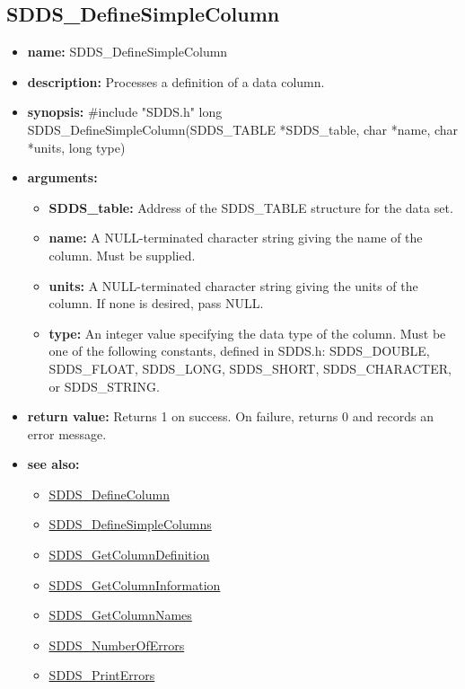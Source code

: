 \documentclass[11pt]{article}
\newcommand{\progref}[1]{\hyperref{SDDS_#1}{{\tt SDDS\_#1} (}{)}{SDDS_#1}}
\begin{document}
\subsection{SDDS\_DefineSimpleColumn}
\label{SDDS_DefineSimpleColumn}

\begin{itemize}
\item {\bf name:}\newline
SDDS\_DefineSimpleColumn
\item {\bf description:}\newline
Processes a definition of a data column.
\item {\bf synopsis:} \#include "SDDS.h"\newline
long SDDS\_DefineSimpleColumn(SDDS\_TABLE *SDDS\_table, char *name, char *units, long type)
\item {\bf arguments:}
\begin{itemize}
\item {\bf SDDS\_table:} Address of the SDDS\_TABLE structure for the data set.
\item {\bf name:} A NULL-terminated character string giving the name of the column. Must be supplied.
\item {\bf units:} A NULL-terminated character string giving the units of the column. If none is desired, pass NULL.
\item {\bf type:} An integer value specifying the data type of the column. Must be one of the following constants, defined in  SDDS.h: SDDS\_DOUBLE, SDDS\_FLOAT, SDDS\_LONG, SDDS\_SHORT, SDDS\_CHARACTER, or SDDS\_STRING.
\end{itemize}
\item {\bf return value:}\newline
Returns 1 on success. On failure, returns 0 and records an error message.
\item {\bf see also:}
\begin{itemize}
\item \progref{DefineColumn}
\item \progref{DefineSimpleColumns}
\item \progref{GetColumnDefinition}
\item \progref{GetColumnInformation}
\item \progref{GetColumnNames}
\item \progref{NumberOfErrors}
\item \progref{PrintErrors}
\end{itemize}
\end{itemize}
\end{document}
